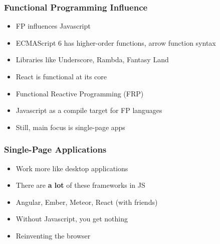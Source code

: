\begin{frame}
  \frametitle{Functional Programming Influence}
  \begin{itemize}
    \pause
    \item<+-> FP influences Javascript
    \item<+-> ECMAScript 6 has higher-order functions, arrow function syntax
    \item<+-> Libraries like Underscore, Rambda, Fantasy Land
    \item<+-> React is functional at its core
    \item<+-> Functional Reactive Programming (FRP)
    \item<+-> Javascript as a compile target for FP languages
    \item<+-> Still, main focus is single-page apps
  \end{itemize}
\end{frame}

\begin{frame}
  \frametitle{Single-Page Applications}
  \begin{itemize}
    \pause
    \item<+-> Work more like desktop applications
    \item<+-> There are \textbf{a lot} of these frameworks in JS
    \item<+-> Angular, Ember, Meteor, React (with friends)
    \item<+-> Without Javascript, you get nothing
    \item<+-> Reinventing the browser
  \end{itemize}
\end{frame}

